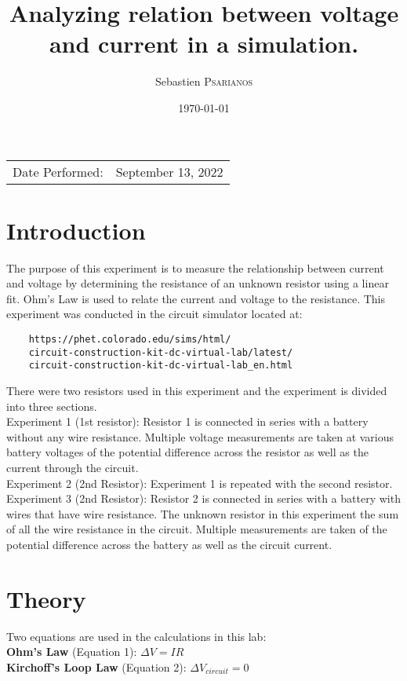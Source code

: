 \documentclass[
	letterpaper, %
	12pt, %
]{CSUniSchoolLabReport}
\title{Analyzing relation between voltage and current in a simulation.}
\author{Sebastien \textsc{Psarianos}}
\date{\today}
\begin{document}
\maketitle

\begin{center}
	\begin{tabular}{l r}
		Date Performed: & September 13, 2022 \\
	\end{tabular}
\end{center}


\section{Introduction}
The purpose of this experiment is to measure the relationship between current and voltage by determining the resistance of an unknown resistor using a linear fit. Ohm's Law is used to relate the current and voltage to the resistance. This experiment was conducted in the circuit simulator located at:
\begin{verbatim}
	https://phet.colorado.edu/sims/html/
	circuit-construction-kit-dc-virtual-lab/latest/
	circuit-construction-kit-dc-virtual-lab_en.html
\end{verbatim}
There were two resistors used in this experiment and the experiment is divided into three sections.\\

Experiment 1 (1st resistor): Resistor 1 is connected in series with a battery without any wire resistance. Multiple voltage measurements are taken at various battery voltages of the potential difference across the resistor as well as the current through the circuit.\\

Experiment 2 (2nd Resistor): Experiment 1 is repeated with the second resistor.\\

Experiment 3 (2nd Resistor): Resistor 2 is connected in series with a battery with wires that have wire resistance. The unknown resistor in this experiment the sum of all the wire resistance in the circuit. Multiple measurements are taken of the potential difference across the battery as well as the circuit current.\\

\section{Theory}
Two equations are used in the calculations in this lab:\\
\textbf{Ohm's Law} (Equation 1): $\Delta V = IR$\\
\textbf{Kirchoff's Loop Law} (Equation 2): $\Delta V_{circuit} = 0$
\end{document}
